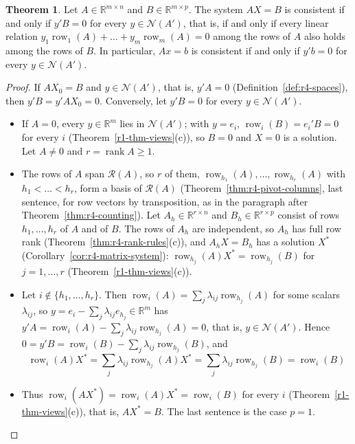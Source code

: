 \documentclass[12pt]{article}
\newcommand{\R}{\mathbb R}
\DeclareMathOperator{\row}{row}
\DeclareMathOperator{\rank}{rank}
\theoremstyle{definition}
\newtheorem{theorem}{Theorem}
\begin{document}
\begin{theorem}\label{thm:r4-compatibility}
Let \(A\in\R^{m\times n}\) and \(B\in\R^{m\times p}\). The system \(AX=B\) is consistent if and only if \(y'B=0\) for
every \(y\in\mathcal N(A')\), that is, if and only if every linear relation
\(y_1\row_1(A)+\dots+y_m\row_m(A)=0\) among the rows of \(A\) also holds among the rows of \(B\). In particular,
\(Ax=b\) is consistent if and only if \(y'b=0\) for every \(y\in\mathcal N(A')\).
\end{theorem}
\begin{proof}
If \(AX_0=B\) and \(y\in\mathcal N(A')\), that is, \(y'A=0\) (Definition~\ref{def:r4-spaces}), then
\(y'B=y'AX_0=0\). Conversely, let \(y'B=0\) for every \(y\in\mathcal N(A')\).
\begin{itemize}
\item If \(A=0\), every \(y\in\R^m\) lies in \(\mathcal N(A')\); with \(y=e_i\), \(\row_i(B)=e_i'B=0\) for every \(i\)
(Theorem~\ref{r1-thm-views}(c)), so \(B=0\) and \(X=0\) is a solution. Let \(A\ne0\) and \(r=\rank A\geqslant1\).
\item The rows of \(A\) span \(\mathcal R(A)\), so \(r\) of them, \(\row_{h_1}(A),\dots,\row_{h_r}(A)\) with
\(h_1<\dots<h_r\), form a basis of \(\mathcal R(A)\) (Theorem~\ref{thm:r4-pivot-columns}, last sentence, for row
vectors by transposition, as in the paragraph after Theorem~\ref{thm:r4-counting}). Let \(A_h\in\R^{r\times n}\) and
\(B_h\in\R^{r\times p}\) consist of rows \(h_1,\dots,h_r\) of \(A\) and of \(B\). The rows of \(A_h\) are independent,
so \(A_h\) has full row rank (Theorem~\ref{thm:r4-rank-rules}(c)), and \(A_hX=B_h\) has a solution \(X^*\)
(Corollary~\ref{cor:r4-matrix-system}): \(\row_{h_j}(A)X^*=\row_{h_j}(B)\) for \(j=1,\dots,r\)
(Theorem~\ref{r1-thm-views}(c)).
\item Let \(i\notin\{h_1,\dots,h_r\}\). Then \(\row_i(A)=\sum_j\lambda_{ij}\row_{h_j}(A)\) for some scalars
\(\lambda_{ij}\), so \(y=e_i-\sum_j\lambda_{ij}e_{h_j}\in\R^m\) has \(y'A=\row_i(A)-\sum_j\lambda_{ij}\row_{h_j}(A)=0\),
that is, \(y\in\mathcal N(A')\). Hence \(0=y'B=\row_i(B)-\sum_j\lambda_{ij}\row_{h_j}(B)\), and
\[
\row_i(A)X^*=\sum_j\lambda_{ij}\row_{h_j}(A)X^*=\sum_j\lambda_{ij}\row_{h_j}(B)=\row_i(B)
\]
\item Thus \(\row_i(AX^*)=\row_i(A)X^*=\row_i(B)\) for every \(i\) (Theorem~\ref{r1-thm-views}(c)), that is,
\(AX^*=B\). The last sentence is the case \(p=1\).\qedhere
\end{itemize}
\end{proof}
\end{document}
